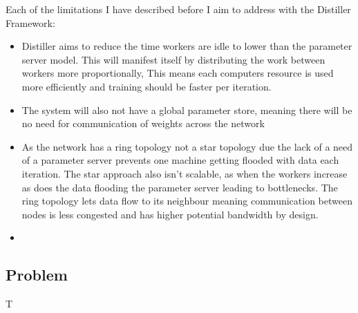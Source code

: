 Each of the limitations I have described before I aim to address with the Distiller Framework:
\begin{itemize}
    \item Distiller aims to reduce the time workers are idle to lower than the
    parameter server model. This will manifest itself by distributing the work
    between workers more proportionally, This means each computers resource is
    used more efficiently and training should be faster per iteration.
    \item The system will also not have a global parameter store, meaning there
    will be no need for communication of weights across the network
    \item As the network has a ring topology not a star topology due the lack of
    a need of a parameter server prevents one machine getting flooded with data
    each iteration. The star approach also isn't scalable, as when the workers
    increase as does the data flooding the parameter server leading to
    bottlenecks. The ring topology lets data flow to its neighbour meaning
    communication between nodes is less congested and has higher potential
    bandwidth by design.
    \item 
\end{itemize}






  












\subsection{Problem}
T\lipsum[4]

